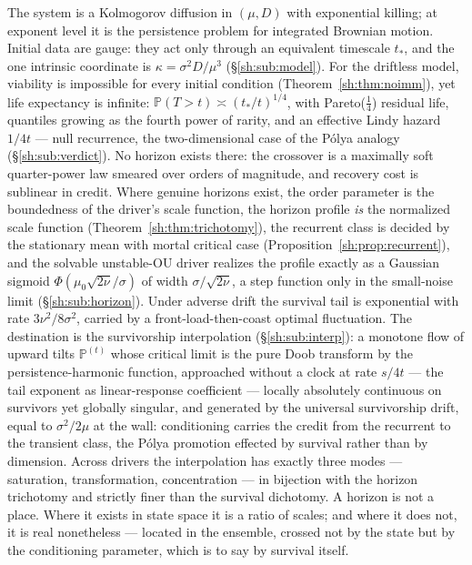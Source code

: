 \documentclass[11pt]{article}
\numberwithin{equation}{section}
\theoremstyle{plain}
\theoremstyle{definition}
\theoremstyle{remark}
\newcommand{\PP}{\mathbb{P}}
\begin{document}


The system is a Kolmogorov diffusion in $(\mu,D)$ with exponential
killing; at exponent level it is the persistence problem for integrated
Brownian motion. Initial data are gauge: they act only through an
equivalent timescale $t_*$, and the one intrinsic coordinate is
$\kappa=\sigma^2D/\mu^3$ (\S\ref{sh:sub:model}). For the driftless model,
viability is impossible for every initial condition
(Theorem~\ref{sh:thm:noimm}), yet life expectancy is infinite:
$\PP(T>t)\asymp(t_*/t)^{1/4}$, with Pareto($\tfrac14$) residual life,
quantiles growing as the fourth power of rarity, and an effective Lindy
hazard $1/4t$ --- null recurrence, the two-dimensional case of the P\'olya
analogy (\S\ref{sh:sub:verdict}). No horizon exists there: the crossover
is a maximally soft quarter-power law smeared over orders of magnitude,
and recovery cost is sublinear in credit. Where genuine horizons exist,
the order parameter is the boundedness of the driver's scale function,
the horizon profile \emph{is} the normalized scale function
(Theorem~\ref{sh:thm:trichotomy}), the recurrent class is decided by the
stationary mean with mortal critical case
(Proposition~\ref{sh:prop:recurrent}), and the solvable unstable-OU
driver realizes the profile exactly as a Gaussian sigmoid
$\Phi(\mu_0\sqrt{2\nu}/\sigma)$ of width $\sigma/\sqrt{2\nu}$, a step
function only in the small-noise limit (\S\ref{sh:sub:horizon}). Under
adverse drift the survival tail is exponential with rate
$3\nu^2/8\sigma^2$, carried by a front-load-then-coast optimal
fluctuation. The destination is the survivorship interpolation
(\S\ref{sh:sub:interp}): a monotone flow of upward tilts $\PP^{(t)}$
whose critical limit is the pure Doob transform by the
persistence-harmonic function, approached without a clock at rate
$s/4t$ --- the tail exponent as linear-response coefficient --- locally
absolutely continuous on survivors yet globally singular, and generated
by the universal survivorship drift, equal to $\sigma^2/2\mu$ at the
wall: conditioning carries the credit from the recurrent to the transient
class, the P\'olya promotion effected by survival rather than by
dimension. Across
drivers the interpolation has exactly three modes --- saturation,
transformation, concentration --- in bijection with the horizon
trichotomy and strictly finer than the survival dichotomy. A horizon is
not a place. Where it exists in state space it is a ratio of scales; and
where it does not, it is real nonetheless --- located in the ensemble,
crossed not by the state but by the conditioning parameter, which is to
say by survival itself.
\end{document}
